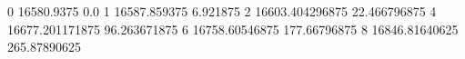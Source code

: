 0 16580.9375 0.0
1 16587.859375 6.921875
2 16603.404296875 22.466796875
4 16677.201171875 96.263671875
6 16758.60546875 177.66796875
8 16846.81640625 265.87890625
